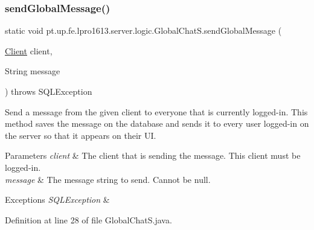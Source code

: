 \subsubsection{\texorpdfstring{send\+Global\+Message()}{sendGlobalMessage()}}
{\footnotesize\ttfamily static void pt.\+up.\+fe.\+lpro1613.\+server.\+logic.\+Global\+Chat\+S.\+send\+Global\+Message (\begin{DoxyParamCaption}\item[{\hyperlink{classpt_1_1up_1_1fe_1_1lpro1613_1_1server_1_1conn_1_1_client}{Client}}]{client,  }\item[{String}]{message }\end{DoxyParamCaption}) throws S\+Q\+L\+Exception\hspace{0.3cm}{\ttfamily [static]}}

Send a message from the given client to everyone that is currently logged-\/in. This method saves the message on the database and sends it to every user logged-\/in on the server so that it appears on their UI.


\begin{DoxyParams}{Parameters}
{\em client} & The client that is sending the message. This client must be logged-\/in. \\
\hline
{\em message} & The message string to send. Cannot be null. \\
\hline
\end{DoxyParams}

\begin{DoxyExceptions}{Exceptions}
{\em S\+Q\+L\+Exception} & \\
\hline
\end{DoxyExceptions}


Definition at line 28 of file Global\+Chat\+S.\+java.

